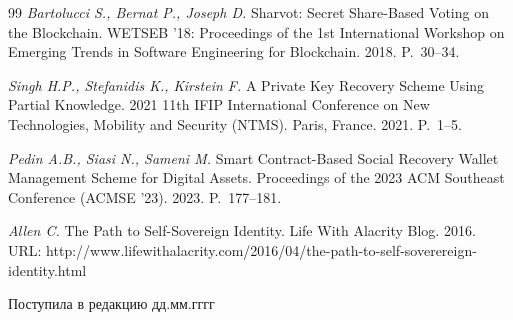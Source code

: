 \begin{thebibliography}{99}
 \textit{Bartolucci S., Bernat P., Joseph D.} Sharvot: Secret Share-Based Voting on the Blockchain. WETSEB '18: Proceedings of the 1st International Workshop on Emerging Trends in Software Engineering for Blockchain. 2018. P.~30--34.

 \textit{Singh H.P., Stefanidis K., Kirstein F.} A Private Key Recovery Scheme Using Partial Knowledge. 2021 11th IFIP International Conference on New Technologies, Mobility and Security (NTMS). Paris, France. 2021. P.~1--5.

 \textit{Pedin A.B., Siasi N., Sameni M.} Smart Contract-Based Social Recovery Wallet Management Scheme for Digital Assets. Proceedings of the 2023 ACM Southeast Conference (ACMSE '23). 2023. P.~177--181.

 \textit{Allen C.} The Path to Self-Sovereign Identity. Life With Alacrity Blog. 2016. URL: http://www.lifewithalacrity.com/2016/04/the-path-to-self-soverereign-identity.html

\end{thebibliography}

\begin{flushright}
Поступила в редакцию дд.мм.гггг
\end{flushright}
